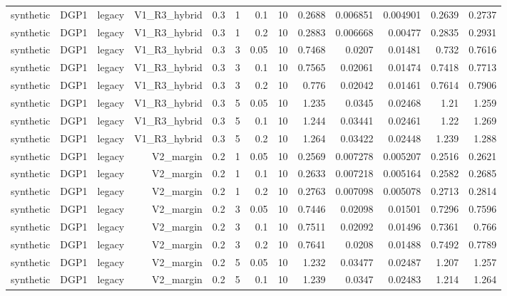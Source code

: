 \begin{table}[htbp]
\begin{tabular}{lrrrrrrrrrrrr}
    synthetic & DGP1 & legacy & V1\_R3\_hybrid & 0.3 & 1 & 0.1 & 10 & 0.2688 & 0.006851 & 0.004901 & 0.2639 & 0.2737 \\
    synthetic & DGP1 & legacy & V1\_R3\_hybrid & 0.3 & 1 & 0.2 & 10 & 0.2883 & 0.006668 & 0.00477 & 0.2835 & 0.2931 \\
    synthetic & DGP1 & legacy & V1\_R3\_hybrid & 0.3 & 3 & 0.05 & 10 & 0.7468 & 0.0207 & 0.01481 & 0.732 & 0.7616 \\
    synthetic & DGP1 & legacy & V1\_R3\_hybrid & 0.3 & 3 & 0.1 & 10 & 0.7565 & 0.02061 & 0.01474 & 0.7418 & 0.7713 \\
    synthetic & DGP1 & legacy & V1\_R3\_hybrid & 0.3 & 3 & 0.2 & 10 & 0.776 & 0.02042 & 0.01461 & 0.7614 & 0.7906 \\
    synthetic & DGP1 & legacy & V1\_R3\_hybrid & 0.3 & 5 & 0.05 & 10 & 1.235 & 0.0345 & 0.02468 & 1.21 & 1.259 \\
    synthetic & DGP1 & legacy & V1\_R3\_hybrid & 0.3 & 5 & 0.1 & 10 & 1.244 & 0.03441 & 0.02461 & 1.22 & 1.269 \\
    synthetic & DGP1 & legacy & V1\_R3\_hybrid & 0.3 & 5 & 0.2 & 10 & 1.264 & 0.03422 & 0.02448 & 1.239 & 1.288 \\
    synthetic & DGP1 & legacy & V2\_margin & 0.2 & 1 & 0.05 & 10 & 0.2569 & 0.007278 & 0.005207 & 0.2516 & 0.2621 \\
    synthetic & DGP1 & legacy & V2\_margin & 0.2 & 1 & 0.1 & 10 & 0.2633 & 0.007218 & 0.005164 & 0.2582 & 0.2685 \\
    synthetic & DGP1 & legacy & V2\_margin & 0.2 & 1 & 0.2 & 10 & 0.2763 & 0.007098 & 0.005078 & 0.2713 & 0.2814 \\
    synthetic & DGP1 & legacy & V2\_margin & 0.2 & 3 & 0.05 & 10 & 0.7446 & 0.02098 & 0.01501 & 0.7296 & 0.7596 \\
    synthetic & DGP1 & legacy & V2\_margin & 0.2 & 3 & 0.1 & 10 & 0.7511 & 0.02092 & 0.01496 & 0.7361 & 0.766 \\
    synthetic & DGP1 & legacy & V2\_margin & 0.2 & 3 & 0.2 & 10 & 0.7641 & 0.0208 & 0.01488 & 0.7492 & 0.7789 \\
    synthetic & DGP1 & legacy & V2\_margin & 0.2 & 5 & 0.05 & 10 & 1.232 & 0.03477 & 0.02487 & 1.207 & 1.257 \\
    synthetic & DGP1 & legacy & V2\_margin & 0.2 & 5 & 0.1 & 10 & 1.239 & 0.0347 & 0.02483 & 1.214 & 1.264 \\
    \bottomrule
  \end{tabular}
\end{table}
